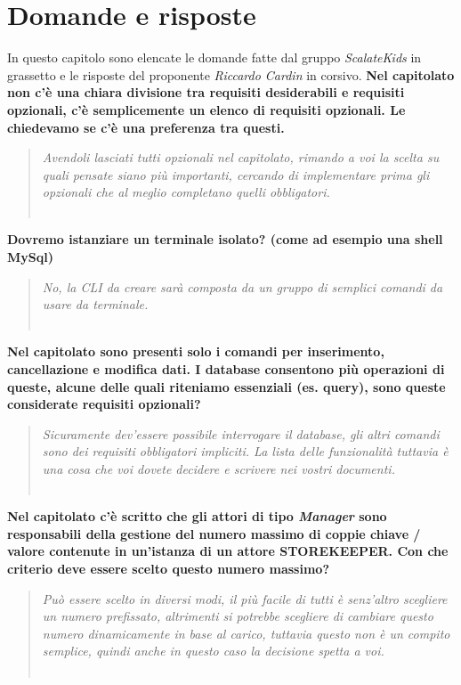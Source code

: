 \documentclass{scalatekids-article}
\begin{document}
\section{Domande e risposte}
In questo capitolo sono elencate le domande fatte dal gruppo \textit{ScalateKids} in grassetto e le risposte del proponente \textit{Riccardo Cardin} in corsivo.
\textbf{Nel capitolato non c'è una chiara divisione tra requisiti desiderabili e requisiti opzionali, c'è semplicemente un elenco di requisiti opzionali. Le chiedevamo se c'è una preferenza tra questi.}
\begin{quote}
  \textit{Avendoli lasciati tutti opzionali nel capitolato, rimando a voi la scelta su quali pensate siano più importanti, cercando di implementare prima gli opzionali che al meglio completano quelli obbligatori.\\ \\}
\end{quote}
\textbf{Dovremo istanziare un terminale isolato? (come ad esempio una shell MySql)}
\begin{quote}
  \textit{No, la CLI da creare sarà composta da un gruppo di semplici comandi da usare da terminale.\\ \\}
\end{quote}
\textbf{Nel capitolato sono presenti solo i comandi per inserimento, cancellazione e modifica dati. I database consentono più operazioni di queste, alcune delle quali riteniamo essenziali (es. query), sono queste considerate requisiti opzionali?}
\begin{quote}
  \textit{Sicuramente dev'essere possibile interrogare il database, gli altri comandi sono dei requisiti obbligatori impliciti. La lista delle funzionalità tuttavia è una cosa che voi dovete decidere e scrivere nei vostri documenti.\\ \\}
\end{quote}
\textbf{Nel capitolato c'è scritto che gli attori di tipo \textit{Manager} sono responsabili della gestione del numero massimo di coppie chiave / valore contenute in un’istanza di un attore STOREKEEPER. Con che criterio deve essere scelto questo numero massimo?}
\begin{quote}
  \textit{Può essere scelto in diversi modi, il più facile di tutti è senz'altro scegliere un numero prefissato, altrimenti si potrebbe scegliere di cambiare questo numero dinamicamente in base al carico, tuttavia questo non è un compito semplice, quindi anche in questo caso la decisione spetta a voi.\\ \\}
\end{quote}
\end{document}

